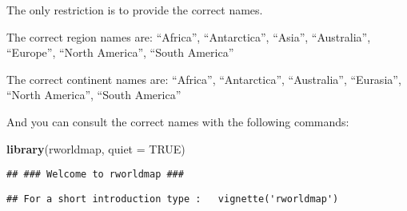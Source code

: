 \documentclass[]{article}
\newenvironment{Shaded}{\begin{snugshade}}{\end{snugshade}}
\newcommand{\KeywordTok}[1]{\textcolor[rgb]{0.13,0.29,0.53}{\textbf{#1}}}
\newcommand{\DataTypeTok}[1]{\textcolor[rgb]{0.13,0.29,0.53}{#1}}
\newcommand{\CommentTok}[1]{\textcolor[rgb]{0.56,0.35,0.01}{\textit{#1}}}
\newcommand{\OtherTok}[1]{\textcolor[rgb]{0.56,0.35,0.01}{#1}}
\newcommand{\OperatorTok}[1]{\textcolor[rgb]{0.81,0.36,0.00}{\textbf{#1}}}
\newcommand{\NormalTok}[1]{#1}
\begin{document}
The only restriction is to provide the correct names.

The correct region names are: ``Africa'', ``Antarctica'', ``Asia'',
``Australia'', ``Europe'', ``North America'', ``South America''

The correct continent names are: ``Africa'', ``Antarctica'',
``Australia'', ``Eurasia'', ``North America'', ``South America''

And you can consult the correct names with the following commands:

\begin{Shaded}
\begin{Highlighting}[]
\KeywordTok{library}\NormalTok{(rworldmap, }\DataTypeTok{quiet =} \OtherTok{TRUE}\NormalTok{)}
\end{Highlighting}
\end{Shaded}

\begin{verbatim}
## ### Welcome to rworldmap ###
\end{verbatim}

\begin{verbatim}
## For a short introduction type :   vignette('rworldmap')
\end{verbatim}

\begin{Shaded}
\end{Shaded}
\end{document}

